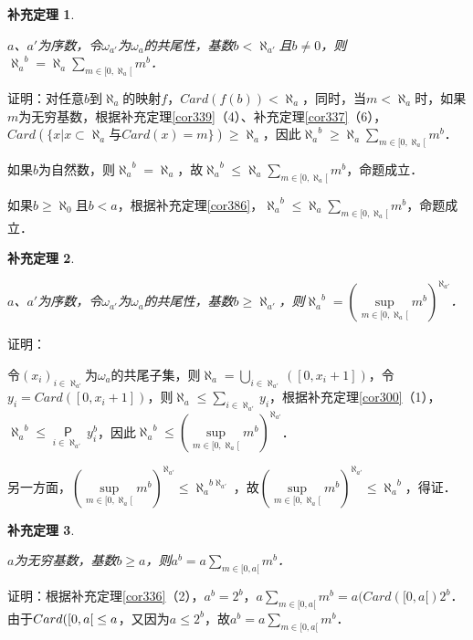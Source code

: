 \documentclass[12pt, a4paper, oneside]{book}
\newtheorem{cor}{补充定理}
\begin{document}
			\begin{cor}\label{cor387}
				\hfill\par
				$a$、$a'$为序数，令$\omega_{a'}$为$\omega_a$的共尾性，基数$b<\aleph_{a'}$且$b\neq 0$，则${\aleph_a}^b=\aleph_a\sum\limits_{m\in [0, \aleph_a[}m^b$．
			\end{cor}
			证明：对任意$b$到$\aleph_a$的映射$f$，$Card(f(b))<\aleph_a$，同时，当$m<\aleph_a$时，如果$m$为无穷基数，根据补充定理\ref{cor339}（4）、补充定理\ref{cor337}（6），$Card(\{x|x\subset \aleph_a\text{与}Card(x)=m\})\geq \aleph_a$，因此${\aleph_a}^b\geq \aleph_a\sum\limits_{m\in [0, \aleph_a[}m^b$．
			\par
			如果$b$为自然数，则${\aleph_a}^b=\aleph_a$，故${\aleph_a}^b\leq \aleph_a\sum\limits_{m\in [0, \aleph_a[}m^b$，命题成立．
			\par
			如果$b\geq \aleph_0$且$b<a$，根据补充定理\ref{cor386}，${\aleph_a}^b\leq \aleph_a\sum\limits_{m\in [0, \aleph_a[}m^b$，命题成立．
			
			\begin{cor}\label{cor388}
				\hfill\par
				$a$、$a'$为序数，令$\omega_{a'}$为$\omega_a$的共尾性，基数$b\geq \aleph_{a'}$，则${\aleph_a}^b=(\mathop{sup}\limits_{m\in [0, \aleph_a[}m^b)^{\aleph_{a'}}$．
			\end{cor}
			证明：
			\par
			令$(x_i)_{i\in \aleph_{a'}}$为$\omega_a$的共尾子集，则$\aleph_a=\bigcup\limits_{i\in \aleph_{a'}}([0, x_i+1])$，令$y_i=Card([0, x_i+1])$，则$\aleph_a\leq \sum\limits_{i\in \aleph_{a'}}y_i$，根据补充定理\ref{cor300}（1），${\aleph_a}^b\leq \mathop{\mathsf{P}}\limits_{i\in \aleph_{a'}}y_i^b$，因此${\aleph_a}^b\leq (\mathop{sup}\limits_{m\in [0, \aleph_a[}m^b)^{\aleph_{a'}}$．
			\par
			另一方面，$(\mathop{sup}\limits_{m\in [0, \aleph_a[}m^b)^{\aleph_{a'}}\leq {\aleph_a}^{b\aleph_{a'}}$，故$(\mathop{sup}\limits_{m\in [0, \aleph_a[}m^b)^{\aleph_{a'}}\leq {\aleph_a}^b$，得证．
			
			\begin{cor}\label{cor389}
				\hfill\par
				$a$为无穷基数，基数$b\geq a$，则$a^b=a\sum\limits_{m\in [0, a[}m^b$．
			\end{cor}
			证明：根据补充定理\ref{cor336}（2），$a^b=2^b$，$a\sum\limits_{m\in [0, a[}m^b=a(Card([0, a[)2^b$．由于$Card([0, a[\\\leq a$，又因为$a\leq 2^b$，故$a^b=a\sum\limits_{m\in [0, a[}m^b$．
			
\end{document}
